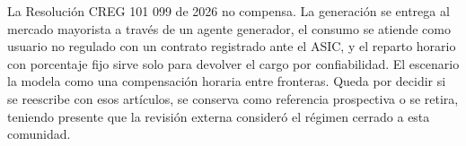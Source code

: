 La Resolución CREG 101 099 de 2026 no compensa. La generación se entrega al
mercado mayorista a través de un agente generador, el consumo se atiende
como usuario no regulado con un contrato registrado ante el ASIC, y el
reparto horario con porcentaje fijo sirve solo para devolver el cargo por
confiabilidad. El escenario la modela como una compensación horaria entre
fronteras. Queda por decidir si se reescribe con esos artículos, se conserva
como referencia prospectiva o se retira, teniendo presente que la revisión
externa consideró el régimen cerrado a esta comunidad.

